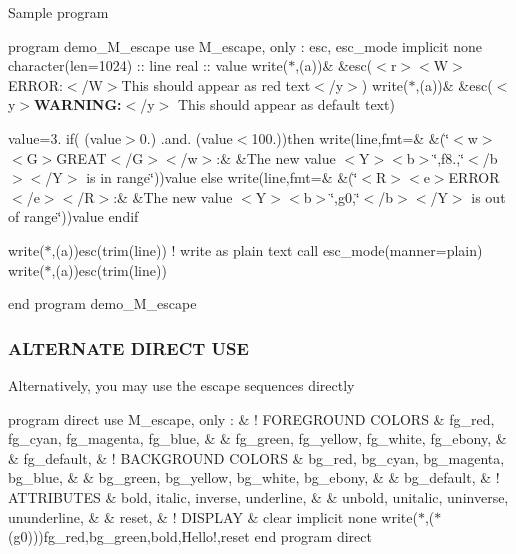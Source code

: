 Sample program

program demo\+\_\+\+M\+\_\+escape use M\+\_\+escape, only \+: esc, esc\+\_\+mode implicit none character(len=1024) \+:\+: line real \+:\+: value write($\ast$,\textquotesingle{}(a)\textquotesingle{})\& \&esc(\textquotesingle{}$<$r$>$$<$\+W$>$E\+R\+R\+OR\+:$<$/\+W$>$This should appear as red text$<$/y$>$\textquotesingle{}) write($\ast$,\textquotesingle{}(a)\textquotesingle{})\& \&esc(\textquotesingle{}$<$y$>${\bfseries W\+A\+R\+N\+I\+NG\+:}$<$/y$>$ This should appear as default text\textquotesingle{})

value=3. if( (value$>$0.) .and. (value$<$100.))then write(line,fmt=\& \&\textquotesingle{}(\char`\"{}$<$w$>$$<$\+G$>$\+G\+R\+E\+A\+T$<$/\+G$>$$<$/w$>$\+:\&
          \&\+The new value $<$\+Y$>$$<$b$>$\char`\"{},f8.,\char`\"{}$<$/b$>$$<$/\+Y$>$ is in range\char`\"{})\textquotesingle{})value else write(line,fmt=\& \&\textquotesingle{}(\char`\"{}$<$\+R$>$$<$e$>$\+E\+R\+R\+O\+R$<$/e$>$$<$/\+R$>$\+:\&
          \&\+The new value $<$\+Y$>$$<$b$>$\char`\"{},g0,\char`\"{}$<$/b$>$$<$/\+Y$>$ is out of range\char`\"{})\textquotesingle{})value endif

write($\ast$,\textquotesingle{}(a)\textquotesingle{})esc(trim(line)) ! write as plain text call esc\+\_\+mode(manner=\textquotesingle{}plain\textquotesingle{}) write($\ast$,\textquotesingle{}(a)\textquotesingle{})esc(trim(line))

end program demo\+\_\+\+M\+\_\+escape

\subsubsection*{A\+L\+T\+E\+R\+N\+A\+TE D\+I\+R\+E\+CT U\+SE}

Alternatively, you may use the escape sequences directly

program direct use M\+\_\+escape, only \+: \& ! F\+O\+R\+E\+G\+R\+O\+U\+ND C\+O\+L\+O\+RS \& fg\+\_\+red, fg\+\_\+cyan, fg\+\_\+magenta, fg\+\_\+blue, \& \& fg\+\_\+green, fg\+\_\+yellow, fg\+\_\+white, fg\+\_\+ebony, \& \& fg\+\_\+default, \& ! B\+A\+C\+K\+G\+R\+O\+U\+ND C\+O\+L\+O\+RS \& bg\+\_\+red, bg\+\_\+cyan, bg\+\_\+magenta, bg\+\_\+blue, \& \& bg\+\_\+green, bg\+\_\+yellow, bg\+\_\+white, bg\+\_\+ebony, \& \& bg\+\_\+default, \& ! A\+T\+T\+R\+I\+B\+U\+T\+ES \& bold, italic, inverse, underline, \& \& unbold, unitalic, uninverse, ununderline, \& \& reset, \& ! D\+I\+S\+P\+L\+AY \& clear implicit none write($\ast$,\textquotesingle{}($\ast$(g0))\textquotesingle{})fg\+\_\+red,bg\+\_\+green,bold,\textquotesingle{}Hello!\textquotesingle{},reset end program direct


